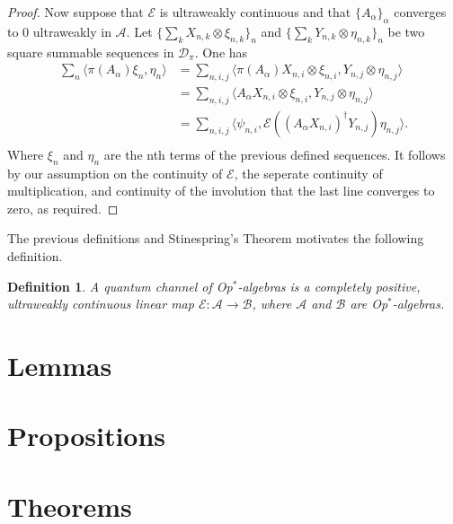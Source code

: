 \documentclass[12pt]{article}
\newtheorem*{definition}{Definition}
\newcommand\mc{\mathcal}
\newcommand\ms{\mathscr}
\newcommand{\ip}[2]{\langle #1, #2 \rangle}
\begin{document}
\begin{proof}
	Now suppose that $\mc{E}$ is ultraweakly continuous and that $\{A_\alpha\}_\alpha$ converges to $0$ ultraweakly in $\ms{A}$.
	Let $\{\sum_k X_{n,k} \otimes \xi_{n, k}\}_n$ and $\{\sum_k Y_{n, k} \otimes \eta_{n, k}\}_n$
	be two square summable sequences in $\mc{D}_\pi$. One has
	\begin{align*}
	   	\sum_n \ip{\pi(A_\alpha)\xi_n}{\eta_n} 
		&= \sum_{n, i, j} \ip{\pi(A_\alpha)X_{n, i} \otimes \xi_{n, i}}{Y_{n, j} \otimes \eta_{n, j}} \\
		&= \sum_{n, i, j} \ip{A_\alpha X_{n,i} \otimes \xi_{n, i}}{Y_{n,j} \otimes \eta_{n,j}} \\
		&= \sum_{n, i, j} \ip{\psi_{n, i}}{\mc{E}((A_\alpha X_{n,i})^\dagger Y_{n,j})\eta_{n, j}}. \\ 
	\end{align*}
	Where $\xi_n$ and $\eta_n$ are the nth terms of the previous defined sequences.	
	It follows by our assumption on the continuity of $\mc{E}$, the seperate continuity of multiplication, and continuity 
	of the involution that the last line converges to zero, as required.
\end{proof}

The previous definitions and Stinespring's Theorem motivates the following definition.

\begin{definition}
	A quantum channel of Op$^*$-algebras is a completely positive, ultraweakly continuous linear map $\mc{E}:\ms{A} \to \ms{B}$, 
	where $\ms{A}$ and $\ms{B}$ are Op$^*$-algebras.
\end{definition}

\section*{Lemmas}

\section*{Propositions}

\section*{Theorems}
\end{document}
